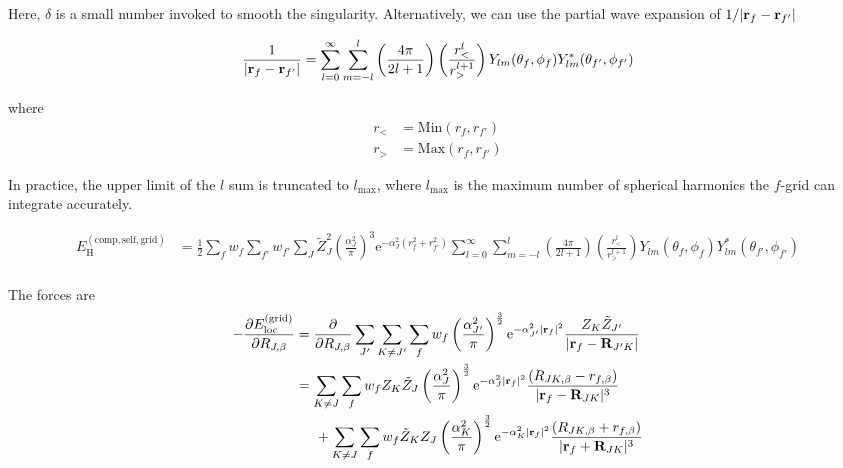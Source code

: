 \documentclass[paper=a4, fontsize=11pt]{article} %
\numberwithin{equation}{section} %
\numberwithin{figure}{section} %
\numberwithin{table}{section} %
\newcommand{\p}{\partial}
\newcommand{\br}{{\bf{r}}}
\newcommand{\bR}{{\bf{R}}}
\newcommand{\rself}{{\mathrm{self}}}
\newcommand{\re}{{\mathrm{e}}}
\newcommand{\rH}{{\mathrm{H}}}
\newcommand{\rcomp}{{\mathrm{comp}}}
\newcommand{\rgrid}{{\mathrm{grid}}}
\newcommand{\rlo}{{\mathrm{loc}}}
\newcommand{\al}{{\alpha}}
\newcommand{\RJb}{{R_{J,\beta}}}
\begin{document}
Here, $\delta$ is a small number invoked to smooth the singularity. Alternatively, we can use the partial wave expansion of $1/|\br_f-\br_{f'}|$

\begin{equation}
\frac{1}{|\br_f-\br_{f'}|} = \sum_{l=0}^\infty \sum_{m=-l}^l \left( \frac{4\pi}{2l+1}\right) \left( \frac{r_{<}^{l}}{r_{>}^{l+1}} \right) Y_{lm} (\theta_f,\phi_f) Y_{lm}^* (\theta_{f'},\phi_{f'}) 
\end{equation}

where
\begin{equation}
\begin{split}
r_{<} &= \mathrm{Min}(r_f, r_{f'}) \\
r_{>} &= \mathrm{Max}(r_f, r_{f'})
\end{split}
\end{equation}

In practice, the upper limit of the $l$ sum is truncated to $l_{\mathrm{max}}$, where $l_{\mathrm{max}}$ is the maximum number of spherical harmonics the $f$-grid can integrate accurately.

\begin{equation}
\begin{split}
E_{\rH}^{(\rcomp,\rself,\rgrid)}
&= \frac{1}{2}\sum_f w_f \sum_{f'} w_{f'} \sum_J \tilde Z_J^2 \left(\frac{\al_J^2}{\pi}\right)^3 \re^{-\al_J^2 \left(r_f^2+r_{f'}^2\right)}\sum_{l=0}^\infty \sum_{m=-l}^l \left( \frac{4\pi}{2l+1}\right) \left( \frac{r_{<}^{l}}{r_{>}^{l+1}} \right) Y_{lm} (\theta_f,\phi_f) Y_{lm}^* (\theta_{f'},\phi_{f'}) \\
\end{split}
\end{equation}

The forces are
\begin{equation}
\begin{split}
-\frac{\p E_{\rlo}^{(\rgrid)}}{\p \RJb} &= \frac{\p}{\p \RJb}\sum_{J'} \sum_{K \neq J'}\sum_f w_f \left(\frac{\al_{J'}^2}{\pi}\right)^{\frac{3}{2}}\re^{-\al_{J'}^2|\br_f|^2} \frac{Z_K\tilde Z_{J'}}{|\br_f - \bR_{J'K}|} \\
&= \sum_{K \neq J} \sum_f w_f Z_K\tilde Z_{J}\left(\frac{\al_{J}^2}{\pi}\right)^{\frac{3}{2}} \re^{-\al_{J}^2|\br_f|^2}\frac{\left(R_{JK,\beta}-r_{f,\beta}\right)}{|\br_f - \bR_{JK}|^3}\\
&\hspace{5mm} +\sum_{K \neq J} \sum_f w_f \tilde Z_K Z_{J}\left(\frac{\al_{K}^2}{\pi}\right)^{\frac{3}{2}} \re^{-\al_{K}^2|\br_f|^2}\frac{\left(R_{JK,\beta}+r_{f,\beta}\right)}{|\br_f + \bR_{JK}|^3}\\ 
\end{split}
\end{equation}
\end{document}
